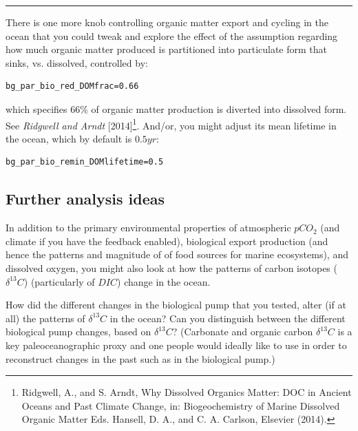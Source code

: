 \vspace{1mm} \noindent\rule{4cm}{0.5pt} \vspace{2mm}

\noindent There is one more knob controlling organic matter export and cycling in the ocean that you could tweak and explore the effect of the assumption regarding how much organic matter produced is partitioned into particulate form that sinks, vs. dissolved, controlled by:
\vspace{-2mm}\small\begin{verbatim}
bg_par_bio_red_DOMfrac=0.66
\end{verbatim}\normalsize\vspace{-2mm}
which specifies 66\% of organic matter production is diverted into dissolved form. See \textit{Ridgwell and Arndt} [2014]\footnote{Ridgwell, A., and S. Arndt, Why Dissolved Organics Matter: DOC in Ancient Oceans and Past Climate Change, in: Biogeochemistry of Marine Dissolved Organic Matter Eds. Hansell, D. A., and C. A. Carlson, Elsevier (2014).}. And/or, you might adjust its mean lifetime in the ocean, which by default is  \(0.5 yr\):
\vspace{-2mm}\small\begin{verbatim}
bg_par_bio_remin_DOMlifetime=0.5
\end{verbatim}\normalsize\vspace{0mm}

\newpage


\subsection{Further analysis ideas}

\noindent In addition to the primary environmental properties of atmospheric \(pCO_{2}\) (and climate if you have the feedback enabled), biological export production (and hence the patterns and magnitude of of food sources for marine ecosystems), and dissolved oxygen, you might also look at how the patterns of carbon isotopes (\(\delta^{13}C\)) (particularly of \(DIC\)) change in the ocean. 

How did the different changes in the biological pump that you tested, alter (if at all) the patterns of \(\delta^{13}C\) in the ocean? Can you distinguish between the different biological pump changes, based on \(\delta^{13}C\)? (Carbonate and organic carbon \(\delta^{13}C\) is a key paleoceanographic proxy and one people would ideally like to use in order to reconstruct changes in the past such as in the biological pump.)

